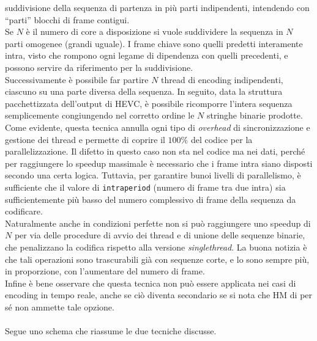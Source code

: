 suddivisione della sequenza di partenza in più parti indipendenti, intendendo 
con ``parti'' blocchi di frame contigui.\\
Se $N$ è il numero di core a disposizione 
si vuole suddividere la sequenza in $N$ parti omogenee (grandi uguale). I frame 
chiave sono quelli predetti interamente intra, visto che rompono ogni 
legame di dipendenza con quelli precedenti, e possono servire da riferimento 
per la suddivisione.\\
Successivamente è possibile far partire $N$ thread di encoding 
indipendenti, ciascuno su una parte diversa della sequenza. In seguito, data la 
struttura 
pacchettizzata dell'output di HEVC, è possibile ricomporre l'intera 
sequenza semplicemente congiungendo nel corretto ordine le $N$ stringhe binarie 
prodotte. \\
Come evidente, questa tecnica annulla ogni tipo di \emph{overhead} di 
sincronizzazione e gestione dei thread e permette di coprire il $100\%$ del 
codice per la parallelizzazione. Il difetto in questo caso non sta nel codice 
ma nei dati, perché per raggiungere lo speedup massimale è necessario che i 
frame intra siano disposti secondo una certa logica. Tuttavia, per garantire 
bunoi livelli di parallelismo, è sufficiente che il valore di 
\verb|intraperiod| (numero di frame tra due intra) sia sufficientemente più 
basso del numero complessivo di frame della sequenza da codificare. \\
Naturalmente anche in condizioni perfette non si può raggiungere uno speedup di 
$N$ per via delle procedure di avvio dei thread e di
unione delle sequenze binarie, che penalizzano la codifica 
rispetto alla versione \emph{singlethread}. La buona 
notizia è che tali operazioni sono trascurabili già con sequenze corte, e lo 
sono sempre più, in proporzione, con l'aumentare del numero di frame.\\
Infine è bene osservare che questa tecnica non può essere applicata 
nei casi di encoding in tempo reale, anche se ciò diventa secondario se si nota 
che HM di per sé non ammette tale opzione.
\\ \\
Segue uno schema che riassume le due tecniche discusse.

